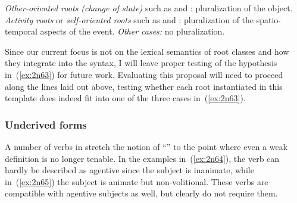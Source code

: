 \begin{exe}
\begin{xlist}
\begin{exe}
\begin{xlist}
\begin{exe}
\begin{xlist}
\begin{exe}
\begin{exe}
\begin{xlist}
\begin{exe}
\begin{xlist}
\begin{exe}
\begin{xlist}
\begin{exe}
\begin{xlist}
\begin{exe}
\begin{xlist}
\begin{exe}
\begin{xlist}
\begin{exe}
\begin{xlist}
\begin{exe}
\begin{xlist}
\begin{exe}
\begin{xlist}
\begin{exe}
\begin{xlist}
\begin{exe}
\begin{xlist}
\begin{exe}
\begin{xlist}
\begin{exe}
\begin{xlist}
\begin{exe}
\begin{exe}
\begin{xlist}
\begin{exe}
\begin{xlist}
\begin{exe}
\begin{xlist}
\begin{exe}
\begin{xlist}
{\begin{exe}
\begin{xlist}
\begin{exe}
\begin{xlist}
\begin{exe}
\begin{xlist}
\begin{exe}
\begin{xlist}
\begin{xlist}
\begin{xlist}
\begin{exe}
\begin{xlist}
\begin{xlist}
\begin{xlist}
\begin{exe}
\begin{exe}
\begin{xlist}
\begin{exe}
\begin{xlist}
\begin{exe}
\begin{xlist}
\begin{exe}
\begin{xlist}
\begin{exe}
\begin{xlist}
\begin{exe}
\begin{xlist}
\begin{exe}
\begin{xlist}
\begin{exe}
\begin{exe}
\begin{xlist}
\begin{xlist}
\begin{exe}
\begin{xlist}
\begin{exe}
\begin{xlist}
\begin{exe}
\begin{xlist}
\begin{exe}
\begin{xlist}
\begin{exe}
\begin{xlist}
\begin{exe}
\begin{xlist}
\begin{exe}
\begin{exe}
\begin{xlist}
\begin{exe}
\begin{xlist}
\begin{exe}
\begin{xlist}
\begin{exe}
\begin{xlist}
\begin{exe}
\begin{xlist}
\begin{exe}
\begin{xlist}
 	\ex   \textit{Other-oriented roots (change of state)} such as  and : pluralization of the object. 
 	\ex   \textit{Activity roots} or \textit{self-oriented roots} such as  and : pluralization of the spatio-temporal aspects of the event. 
 	\ex   \textit{Other cases:} no pluralization. 
 \z
\z 

Since our current focus is not on the lexical semantics of root classes and how they integrate into the syntax, I will leave proper testing of the hypothesis in~(\ref{ex:2n63}) for future work. Evaluating this proposal will need to proceed along the lines laid out above, testing whether each root instantiated in this template does indeed fit into one of the three cases in~(\ref{ex:2n63}).

		\subsubsection{Underived forms} \label{voice:va:sem:underived}
A number of verbs in {\tpie} stretch the notion of ``'' to the point where even a weak definition is no longer tenable. In the examples in~(\ref{ex:2n64}), the verb can hardly be described as agentive since the subject is inanimate, while in~(\ref{ex:2n65}) the subject is animate but non-volitional. These verbs are compatible with agentive subjects as well, but clearly do not require them.
 \begin{exe}
 \ex  \label{ex:2n64}
 \begin{xlist} 
  
    
\end{xlist}
\end{exe}
\end{xlist}
\end{exe}
\end{xlist}
\end{exe}
\end{xlist}
\end{exe}
\end{xlist}
\end{exe}
\end{xlist}
\end{exe}
\end{xlist}
\end{exe}
\end{exe}
\end{xlist}
\end{exe}
\end{xlist}
\end{exe}
\end{xlist}
\end{exe}
\end{xlist}
\end{exe}
\end{xlist}
\end{exe}
\end{xlist}
\end{exe}
\end{xlist}
\end{xlist}
\end{exe}
\end{exe}
\end{xlist}
\end{exe}
\end{xlist}
\end{exe}
\end{xlist}
\end{exe}
\end{xlist}
\end{exe}
\end{xlist}
\end{exe}
\end{xlist}
\end{exe}
\end{xlist}
\end{exe}
\end{exe}
\end{xlist}
\end{xlist}
\end{xlist}
\end{exe}
\end{xlist}
\end{xlist}
\end{xlist}
\end{exe}
\end{xlist}
\end{exe}
\end{xlist}
\end{exe}
\end{xlist}
\end{exe}}
\end{xlist}
\end{exe}
\end{xlist}
\end{exe}
\end{xlist}
\end{exe}
\end{xlist}
\end{exe}
\end{exe}
\end{xlist}
\end{exe}
\end{xlist}
\end{exe}
\end{xlist}
\end{exe}
\end{xlist}
\end{exe}
\end{xlist}
\end{exe}
\end{xlist}
\end{exe}
\end{xlist}
\end{exe}
\end{xlist}
\end{exe}
\end{xlist}
\end{exe}
\end{xlist}
\end{exe}
\end{xlist}
\end{exe}
\end{xlist}
\end{exe}
\end{xlist}
\end{exe}
\end{exe}
\end{xlist}
\end{exe}
\end{xlist}
\end{exe}
\end{xlist}
\end{exe}
